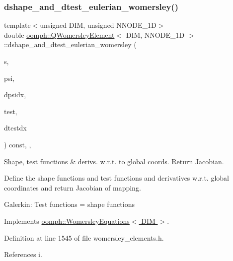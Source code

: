 \subsubsection{\texorpdfstring{dshape\+\_\+and\+\_\+dtest\+\_\+eulerian\+\_\+womersley()}{dshape\_and\_dtest\_eulerian\_womersley()}}
{\footnotesize\ttfamily template$<$unsigned D\+IM, unsigned N\+N\+O\+D\+E\+\_\+1D$>$ \\
double \hyperlink{classoomph_1_1QWomersleyElement}{oomph\+::\+Q\+Womersley\+Element}$<$ D\+IM, N\+N\+O\+D\+E\+\_\+1D $>$\+::dshape\+\_\+and\+\_\+dtest\+\_\+eulerian\+\_\+womersley (\begin{DoxyParamCaption}\item[{const \hyperlink{classoomph_1_1Vector}{Vector}$<$ double $>$ \&}]{s,  }\item[{\hyperlink{classoomph_1_1Shape}{Shape} \&}]{psi,  }\item[{\hyperlink{classoomph_1_1DShape}{D\+Shape} \&}]{dpsidx,  }\item[{\hyperlink{classoomph_1_1Shape}{Shape} \&}]{test,  }\item[{\hyperlink{classoomph_1_1DShape}{D\+Shape} \&}]{dtestdx }\end{DoxyParamCaption}) const\hspace{0.3cm}{\ttfamily [inline]}, {\ttfamily [protected]}, {\ttfamily [virtual]}}



\hyperlink{classoomph_1_1Shape}{Shape}, test functions \& derivs. w.\+r.\+t. to global coords. Return Jacobian. 

Define the shape functions and test functions and derivatives w.\+r.\+t. global coordinates and return Jacobian of mapping.

Galerkin\+: Test functions = shape functions 

Implements \hyperlink{classoomph_1_1WomersleyEquations_a26d31e02c3fb483c76402823e09d67c7}{oomph\+::\+Womersley\+Equations$<$ D\+I\+M $>$}.



Definition at line 1545 of file womersley\+\_\+elements.\+h.



References i.

\mbox{\label{classoomph_1_1QWomersleyElement_af95b3c5a12638d2bfcc97435a987f8cf}} 
